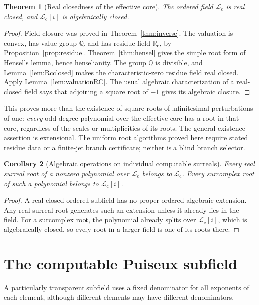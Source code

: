 \documentclass[11pt,letterpaper]{article}
\numberwithin{equation}{section}
\newtheorem{theorem}{Theorem}[section]
\newtheorem{corollary}[theorem]{Corollary}
\theoremstyle{definition}
\theoremstyle{remark}
\newcommand{\Rc}{\mathbb R_{\mathrm c}}
\newcommand{\Lc}{\mathcal L_{\mathrm c}}
\newcommand{\Q}{\mathbb Q}
\begin{document}
\begin{theorem}[Real closedness of the effective core]
\label{thm:Lcrealclosed}
The ordered field $\Lc$ is real closed, and $\Lc[i]$ is algebraically
closed.
\end{theorem}
\begin{proof}
Field closure was proved in Theorem~\ref{thm:inverse}. The valuation is
convex, has value group $\Q$, and has residue field $\Rc$, by
Proposition~\ref{prop:residue}. Theorem~\ref{thm:hensel} gives the simple
root form of Hensel's lemma, hence henselianity. The group $\Q$ is divisible,
and Lemma~\ref{lem:Rcclosed} makes the characteristic-zero residue field
real closed. Apply Lemma~\ref{lem:valuationRC}. The usual algebraic
characterization of a real-closed field says that adjoining a square root
of $-1$ gives its algebraic closure.
\end{proof}

This proves more than the existence of square roots of infinitesimal
perturbations of one: \emph{every} odd-degree polynomial over the effective
core has a root in that core, regardless of the scales or multiplicities
of its roots. The general existence assertion is extensional. The uniform root algorithms proved here require stated residue data or
a finite-jet branch certificate; neither is a blind branch selector.

\begin{corollary}[Algebraic operations on individual computable surreals]
Every real surreal root of a \emph{nonzero} polynomial over $\Lc$ belongs to $\Lc$.
Every surcomplex root of such a polynomial belongs to $\Lc[i]$.
\end{corollary}
\begin{proof}
A real-closed ordered subfield has no proper ordered algebraic extension.
Any real surreal root generates such an extension unless it already lies
in the field. For a surcomplex root, the polynomial already splits over
$\Lc[i]$, which is algebraically closed, so every root in a larger field
is one of its roots there.
\end{proof}

\section{The computable Puiseux subfield}
\label{sec:puiseux}

A particularly transparent subfield uses a fixed denominator for all
exponents of each element, although different elements may have different
denominators.
\end{document}
